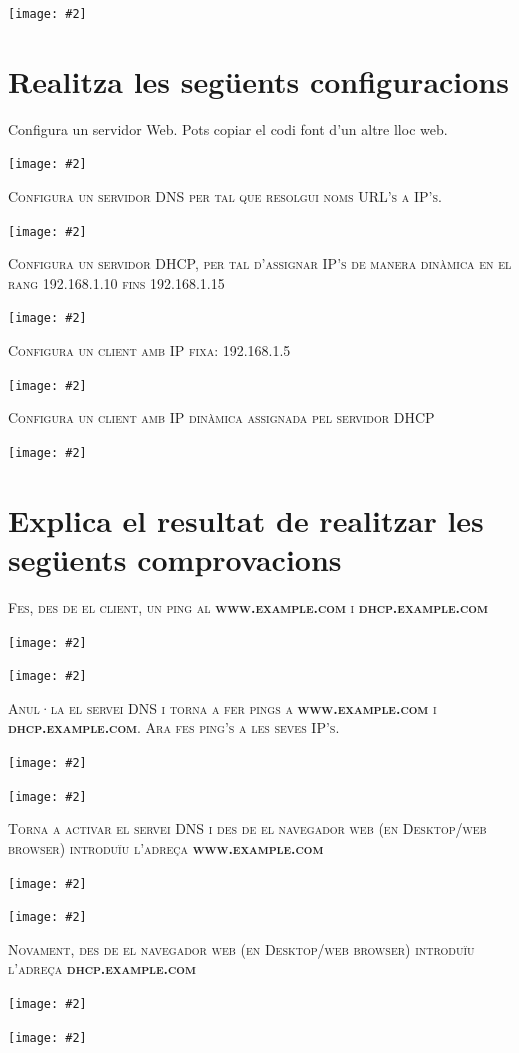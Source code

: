 \documentclass[a4paper,12pt]{article}
\newcommand{\mygraphic}[2][height=0.45\textheight]{\begin{center}
		\centering\texttt{[image: \#2]}\par
\end{center}}
\begin{document}


\tableofcontents
\newpage

\mygraphic[height=0.4\textheight]{imatges/e2.png}

\section{Realitza les següents configuracions}
Configura un servidor Web. Pots copiar el codi font d’un altre lloc web.
\mygraphic{imatges/01.png}

\textsc{Configura un servidor DNS per tal que resolgui noms URL’s a IP’s.}
\mygraphic{imatges/02.png}

\textsc{Configura un servidor DHCP,  per tal d’assignar IP’s de manera dinàmica en el rang 192.168.1.10 fins 192.168.1.15}
\mygraphic{imatges/03.png}

\textsc{Configura un client amb IP fixa: 192.168.1.5}
\mygraphic{imatges/04.png}

\textsc{Configura un client amb IP dinàmica assignada pel servidor DHCP}
\mygraphic{imatges/05.png}

\section{Explica el resultat de realitzar les següents comprovacions}
\textsc{Fes, des de el client, un ping al \textbf{www.example.com} i \textbf{dhcp.example.com}}
\mygraphic{imatges/05.png}
\mygraphic{imatges/06.png}

\textsc{Anul·la el servei DNS i torna a fer pings a \textbf{www.example.com} i \textbf{dhcp.example.com}. Ara fes  ping’s a les seves IP’s.}
\mygraphic{imatges/07.png}
\mygraphic{imatges/08.png}

\textsc{Torna a activar el servei DNS i des de el navegador web (en Desktop/web browser) introduïu l’adreça \textbf{www.example.com}}
\mygraphic{imatges/09.png}
\mygraphic{imatges/10.png}

\textsc{Novament, des de el navegador web (en Desktop/web browser) introduïu l’adreça \textbf{dhcp.example.com}}
\mygraphic{imatges/11.png}
\mygraphic{imatges/12.png}
\end{document}
